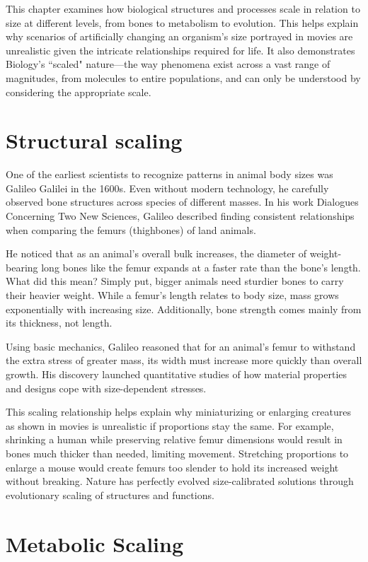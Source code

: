 This chapter examines how biological structures and processes scale in relation to size at different levels, from bones to metabolism to evolution. This helps explain why scenarios of artificially changing an organism's size portrayed in movies are unrealistic given the intricate relationships required for life. It also demonstrates Biology's ``scaled" nature---the way phenomena exist across a vast range of magnitudes, from molecules to entire populations, and can only be understood by considering the appropriate scale.

\section{Structural scaling}

One of the earliest scientists to recognize patterns in animal body sizes was Galileo Galilei in the 1600s. Even without modern technology, he carefully observed bone structures across species of different masses. In his work \emph{}{Dialogues Concerning Two New Sciences}, Galileo described finding consistent relationships when comparing the femurs (thighbones) of land animals.

He noticed that as an animal's overall bulk increases, the diameter of weight-bearing long bones like the femur expands at a faster rate than the bone's length. What did this mean? Simply put, bigger animals need sturdier bones to carry their heavier weight. While a femur's length relates to body size, mass grows exponentially with increasing size. Additionally, bone strength comes mainly from its thickness, not length.

Using basic mechanics, Galileo reasoned that for an animal's femur to withstand the extra stress of greater mass, its width must increase more quickly than overall growth. His discovery launched quantitative studies of how material properties and designs cope with size-dependent stresses. 

This scaling relationship helps explain why miniaturizing or enlarging creatures as shown in movies is unrealistic if proportions stay the same. For example, shrinking a human while preserving relative femur dimensions would result in bones much thicker than needed, limiting movement. Stretching proportions to enlarge a mouse would create femurs too slender to hold its increased weight without breaking. Nature has perfectly evolved size-calibrated solutions through evolutionary scaling of structures and functions.

\section{Metabolic Scaling}

